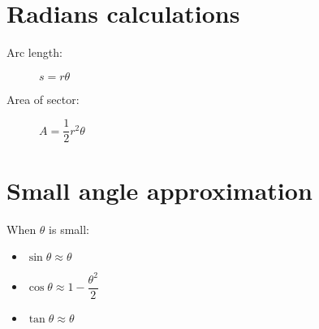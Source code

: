 \section{Radians calculations}
\begin{description}
    \item[Arc length:] $s=r\theta$
    \item[Area of sector:] $A=\dfrac{1}{2}r^2\theta$
\end{description}

\section{Small angle approximation}
When $\theta$ is small:
\begin{itemize}
    \item $\sin \theta \approx \theta$
    \item $\cos \theta \approx 1-\dfrac{\theta^2}{2}$
    \item $\tan \theta \approx \theta$
\end{itemize}
